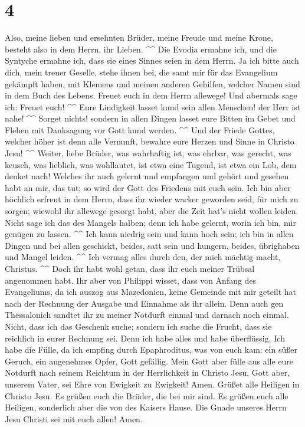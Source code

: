 \hypertarget{section-2}{%
\section{4}\label{section-2}}

 Also, meine lieben und ersehnten Brüder, meine Freude und
meine Krone, besteht also in dem Herrn, ihr Lieben. \^{}\^{}
 Die Evodia ermahne ich, und die Syntyche ermahne ich, dass
sie eines Sinnes seien in dem Herrn.  Ja ich bitte auch
dich, mein treuer Geselle, stehe ihnen bei, die samt mir für das
Evangelium gekämpft haben, mit Klemens und meinen anderen Gehilfen,
welcher Namen sind in dem Buch des Lebens.  Freuet euch in
dem Herrn allewege! Und abermals sage ich: Freuet euch! \^{}\^{}
 Eure Lindigkeit lasset kund sein allen Menschen! der Herr
ist nahe! \^{}\^{}  Sorget nichts! sondern in allen Dingen
lasset eure Bitten im Gebet und Flehen mit Danksagung vor Gott kund
werden. \^{}\^{}  Und der Friede Gottes, welcher höher ist
denn alle Vernunft, bewahre eure Herzen und Sinne in Christo Jesu!
\^{}\^{}  Weiter, liebe Brüder, was wahrhaftig ist, was
ehrbar, was gerecht, was keusch, was lieblich, was wohllautet, ist etwa
eine Tugend, ist etwa ein Lob, dem denket nach!  Welches ihr
auch gelernt und empfangen und gehört und gesehen habt an mir, das tut;
so wird der Gott des Friedens mit euch sein.  Ich bin aber
höchlich erfreut in dem Herrn, dass ihr wieder wacker geworden seid, für
mich zu sorgen; wiewohl ihr allewege gesorgt habt, aber die Zeit hat's
nicht wollen leiden.  Nicht sage ich das des Mangels
halben; denn ich habe gelernt, worin ich bin, mir genügen zu lassen.
\^{}\^{}  Ich kann niedrig sein und kann hoch sein; ich bin
in allen Dingen und bei allen geschickt, beides, satt sein und hungern,
beides, übrighaben und Mangel leiden. \^{}\^{}  Ich vermag
alles durch den, der mich mächtig macht, Christus. \^{}\^{}
 Doch ihr habt wohl getan, dass ihr euch meiner Trübsal
angenommen habt.  Ihr aber von Philippi wisset, dass von
Anfang des Evangeliums, da ich auszog aus Mazedonien, keine Gemeinde mit
mir geteilt hat nach der Rechnung der Ausgabe und Einnahme als ihr
allein.  Denn auch gen Thessalonich sandtet ihr zu meiner
Notdurft einmal und darnach noch einmal.  Nicht, dass ich
das Geschenk suche; sondern ich suche die Frucht, dass sie reichlich in
eurer Rechnung sei.  Denn ich habe alles und habe
überflüssig. Ich habe die Fülle, da ich empfing durch Epaphroditus, was
von euch kam: ein süßer Geruch, ein angenehmes Opfer, Gott gefällig.
 Mein Gott aber fülle aus alle eure Notdurft nach seinem
Reichtum in der Herrlichkeit in Christo Jesu.  Gott aber,
unserem Vater, sei Ehre von Ewigkeit zu Ewigkeit! Amen. 
Grüßet alle Heiligen in Christo Jesu. Es grüßen euch die Brüder, die bei
mir sind.  Es grüßen euch alle Heiligen, sonderlich aber
die von des Kaisers Hause.  Die Gnade unseres Herrn Jesu
Christi sei mit euch allen! Amen.
